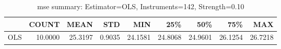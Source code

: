 \begin{table}[ht]
\centering
\caption{mse summary: Estimator=OLS, Instruments=142, Strength=0.10}
\begin{tabular}{lrrrrrrrr}
\toprule
 & COUNT & MEAN & STD & MIN & 25\% & 50\% & 75\% & MAX \\
\midrule
OLS & 10.0000 & 25.3197 & 0.9035 & 24.1581 & 24.8068 & 24.9601 & 26.1254 & 26.7218 \\
\bottomrule
\end{tabular}
\end{table}
